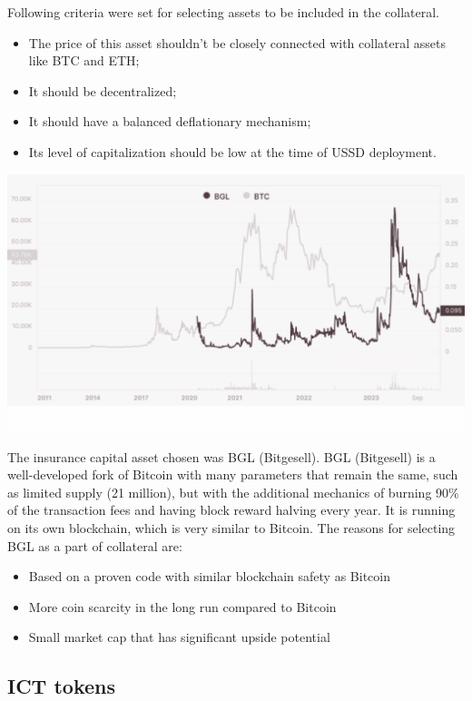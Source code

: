 Following criteria were set for selecting assets to be included in the collateral.

\begin{itemize}
	\item The price of this asset shouldn't be closely connected with collateral assets like BTC and ETH;
	\item It should be decentralized;
	\item It should have a balanced deflationary mechanism;
	\item Its level of capitalization should be low at the time of USSD deployment.
\end{itemize}

\centerline{\includegraphics[scale=0.24]{image04.png}}

The insurance capital asset chosen was BGL (Bitgesell). BGL (Bitgesell) is a well-developed fork of Bitcoin with many parameters that remain the same, such as limited supply (21 million), but with the additional mechanics of burning 90\% of the transaction fees and having block reward halving every year. It is running on its own blockchain, which is very similar to Bitcoin. The reasons for selecting BGL as a part of collateral are:

\begin{itemize}
	\item Based on a proven code with similar blockchain safety as Bitcoin
	\item More coin scarcity in the long run compared to Bitcoin
	\item Small market cap that has significant upside potential
\end{itemize}


\subsection{ICT tokens}

